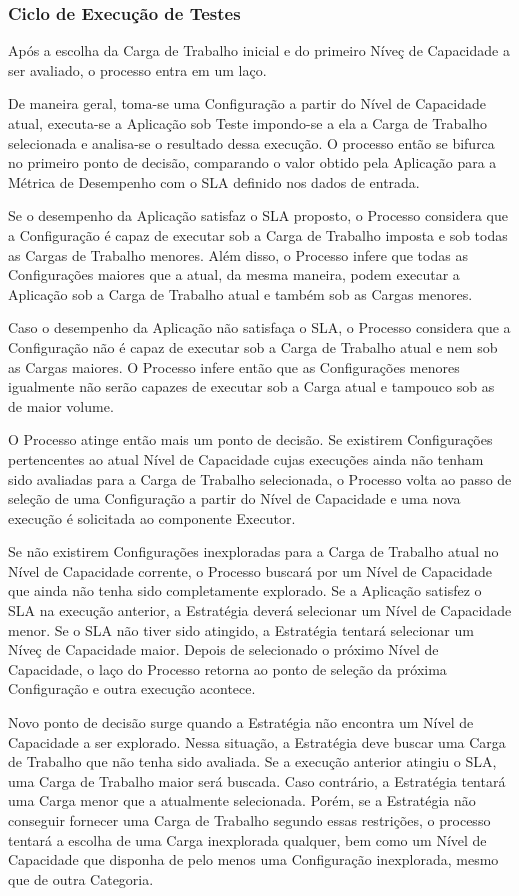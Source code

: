\subsubsection{Ciclo de Execução de Testes}
Após a escolha da Carga de Trabalho inicial e do primeiro Níveç de Capacidade a
ser avaliado, o processo entra em um laço. 

De maneira geral, toma-se uma Configuração a partir do Nível de Capacidade atual, 
executa-se a Aplicação sob Teste impondo-se a ela a Carga de Trabalho selecionada 
e analisa-se o resultado dessa execução. O processo então se bifurca no primeiro
ponto de decisão, comparando o valor obtido pela Aplicação para a Métrica de 
Desempenho com o SLA definido nos dados de entrada.

Se o desempenho da Aplicação satisfaz o SLA proposto, o Processo considera que a
Configuração é capaz de executar sob a Carga de Trabalho imposta e sob todas as
Cargas de Trabalho menores. Além disso, o Processo infere que todas as 
Configurações maiores que a atual, da mesma maneira, podem executar
a Aplicação sob a Carga de Trabalho atual e também sob as Cargas menores. 

Caso o desempenho da Aplicação não satisfaça o SLA, o Processo considera que a 
Configuração não é capaz de executar sob a Carga de Trabalho atual e nem sob as
Cargas maiores. O Processo infere então que as Configurações menores igualmente
não serão capazes de executar sob a Carga atual e tampouco sob as de maior volume.

O Processo atinge então mais um ponto de decisão. Se existirem Configurações
pertencentes ao atual Nível de Capacidade cujas execuções ainda não tenham sido 
avaliadas para a Carga de Trabalho selecionada, o Processo volta ao passo de 
seleção de uma Configuração a partir do Nível de Capacidade e uma nova execução
é solicitada ao componente Executor.

Se não existirem Configurações inexploradas para a Carga de Trabalho atual no
Nível de Capacidade corrente, o Processo buscará por um Nível de Capacidade que 
ainda não tenha sido completamente explorado. Se a Aplicação satisfez o SLA na 
execução anterior, a Estratégia deverá selecionar um Nível de Capacidade menor. 
Se o SLA não tiver sido atingido, a Estratégia tentará selecionar um  Níveç de 
Capacidade maior. Depois de selecionado o próximo Nível de Capacidade, o laço do
Processo retorna ao ponto de seleção da próxima Configuração e outra execução 
acontece.
   
Novo ponto de decisão surge quando a Estratégia não encontra um Nível de 
Capacidade a ser explorado. Nessa situação, a Estratégia deve buscar uma Carga 
de Trabalho que não tenha sido avaliada. Se a execução anterior atingiu o SLA,
uma Carga de Trabalho maior será buscada. Caso contrário, a Estratégia tentará
uma Carga menor que a atualmente selecionada. Porém, se a Estratégia não conseguir 
fornecer uma Carga de Trabalho segundo essas restrições, o processo tentará a 
escolha de uma Carga inexplorada qualquer, bem como um Nível de Capacidade que 
disponha de pelo menos uma Configuração inexplorada, mesmo que de outra Categoria.    

